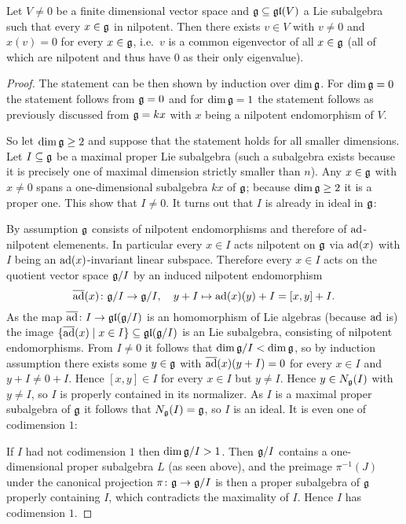\begin{prop}\label{prop: common eigenvector for nilpotent Lie algebras}
 Let $V \neq 0$ be a finite dimensional vector space and $\mathfrak{g} \subseteq \mathfrak{gl}(V)$ a Lie subalgebra such that every $x \in \mathfrak{g}$ in nilpotent. Then there exists $v \in V$ with $v \neq 0$ and $x(v) = 0$ for every $x \in \mathfrak{g}$, i.e.\ $v$ is a common eigenvector of all $x \in \mathfrak{g}$ (all of which are nilpotent and thus have $0$ as their only eigenvalue).
\end{prop}
\begin{proof}
 The statement can be then shown by induction over $\dim \mathfrak{g}$. For $\dim \mathfrak{g} = 0$ the statement follows from $\mathfrak{g} = 0$ and for $\dim \mathfrak{g} = 1$ the statement follows as previously discussed from $\mathfrak{g} = k x$ with $x$ being a nilpotent endomorphism of $V$.
 
 So let $\dim \mathfrak{g} \geq 2$ and suppose that the statement holds for all smaller dimensions. Let $I \subseteq \mathfrak{g}$ be a maximal proper Lie subalgebra (such a subalgebra exists because it is precisely one of maximal dimension strictly smaller than $n$). Any $x \in \mathfrak{g}$ with $x \neq 0$ spans a one-dimensional subalgebra $k x$ of $\mathfrak{g}$; because $\dim \mathfrak{g} \geq 2$ it is a proper one. This show that $I \neq 0$. It turns out that $I$ is already in ideal in $\mathfrak{g}$:
 
 By assumption $\mathfrak{g}$ consists of nilpotent endomorphisms and therefore of $\operatorname{ad}$-nilpotent elemenents. In particular every $x \in I$ acts nilpotent on $\mathfrak{g}$ via $\operatorname{ad}(x)$ with $I$ being an $\operatorname{ad}(x)$-invariant linear subspace. Therefore every $x \in I$ acts on the quotient vector space $\mathfrak{g}/I$ by an induced nilpotent endomorphism
 \[
  \overline{\operatorname{ad}}(x) \colon \mathfrak{g}/I \to \mathfrak{g}/I, \quad y + I \mapsto \operatorname{ad}(x)(y) + I = [x,y] + I.
 \]
 As the map $\overline{\operatorname{ad}} \colon I \to \mathfrak{gl}(\mathfrak{g}/I)$ is an homomorphism of Lie algebras (because $\operatorname{ad}$ is) the image $\{\overline{\operatorname{ad}}(x) \mid x \in I\} \subseteq \mathfrak{gl}(\mathfrak{g}/I)$ is an Lie subalgebra, consisting of nilpotent endomorphisms. From $I \neq 0$ it follows that $\dim \mathfrak{g}/I < \dim \mathfrak{g}$, so by induction assumption there exists some $y \in \mathfrak{g}$ with $\overline{\operatorname{ad}}(x)(y+I) = 0$ for every $x \in I$ and $y+I \neq 0+I$. Hence $[x,y] \in I$ for every $x \in I$ but $y \neq I$. Hence $y \in N_{\mathfrak{g}}(I)$ with $y \neq I$, so $I$ is properly contained in its normalizer. As $I$ is a maximal proper subalgebra of $\mathfrak{g}$ it follows that $N_{\mathfrak{g}}(I) = \mathfrak{g}$, so $I$ is an ideal. It is even one of codimension $1$:
 
 If $I$ had not codimension $1$ then $\dim \mathfrak{g}/I > 1$. Then $\mathfrak{g}/I$ contains a one-dimensional proper subalgebra $L$ (as seen above), and the preimage $\pi^{-1}(J)$ under the canonical projection $\pi \colon \mathfrak{g} \to \mathfrak{g}/I$ is then a proper subalgebra of $\mathfrak{g}$ properly containing $I$, which contradicts the maximality of $I$. Hence $I$ has codimension $1$.
 

\end{proof}
